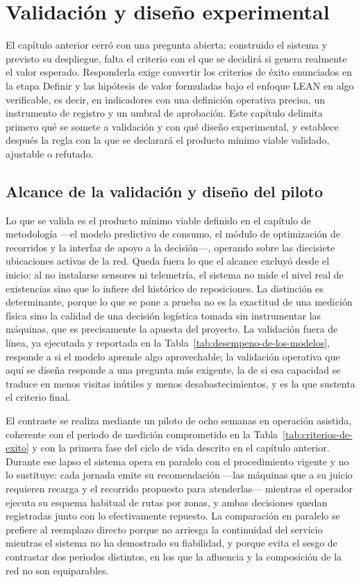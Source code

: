\section{Validación y diseño experimental}\label{validacion-y-diseno-experimental}

El capítulo anterior cerró con una pregunta abierta: construido el sistema y previsto su despliegue, falta el criterio con el que se decidirá si genera realmente el valor esperado. Responderla exige convertir los criterios de éxito enunciados en la etapa Definir y las hipótesis de valor formuladas bajo el enfoque LEAN en algo verificable, es decir, en indicadores con una definición operativa precisa, un instrumento de registro y un umbral de aprobación. Este capítulo delimita primero qué se somete a validación y con qué diseño experimental, y establece después la regla con la que se declarará el producto mínimo viable validado, ajustable o refutado.

\subsection{Alcance de la validación y diseño del piloto}\label{alcance-de-la-validacion-y-diseno-del-piloto}

Lo que se valida es el producto mínimo viable definido en el capítulo de metodología —el modelo predictivo de consumo, el módulo de optimización de recorridos y la interfaz de apoyo a la decisión—, operando sobre las diecisiete ubicaciones activas de la red. Queda fuera lo que el alcance excluyó desde el inicio: al no instalarse sensores ni telemetría, el sistema no mide el nivel real de existencias sino que lo infiere del histórico de reposiciones. La distinción es determinante, porque lo que se pone a prueba no es la exactitud de una medición física sino la calidad de una decisión logística tomada sin instrumentar las máquinas, que es precisamente la apuesta del proyecto. La validación fuera de línea, ya ejecutada y reportada en la Tabla~\ref{tab:desempeno-de-los-modelos}, responde a si el modelo aprende algo aprovechable; la validación operativa que aquí se diseña responde a una pregunta más exigente, la de si esa capacidad se traduce en menos visitas inútiles y menos desabastecimientos, y es la que sustenta el criterio final.

El contraste se realiza mediante un piloto de ocho semanas en operación asistida, coherente con el periodo de medición comprometido en la Tabla~\ref{tab:criterios-de-exito} y con la primera fase del ciclo de vida descrito en el capítulo anterior. Durante ese lapso el sistema opera en paralelo con el procedimiento vigente y no lo sustituye: cada jornada emite su recomendación —las máquinas que a su juicio requieren recarga y el recorrido propuesto para atenderlas— mientras el operador ejecuta su esquema habitual de rutas por zonas, y ambas decisiones quedan registradas junto con lo efectivamente repuesto. La comparación en paralelo se prefiere al reemplazo directo porque no arriesga la continuidad del servicio mientras el sistema no ha demostrado su fiabilidad, y porque evita el sesgo de contrastar dos periodos distintos, en los que la afluencia y la composición de la red no son equiparables.

